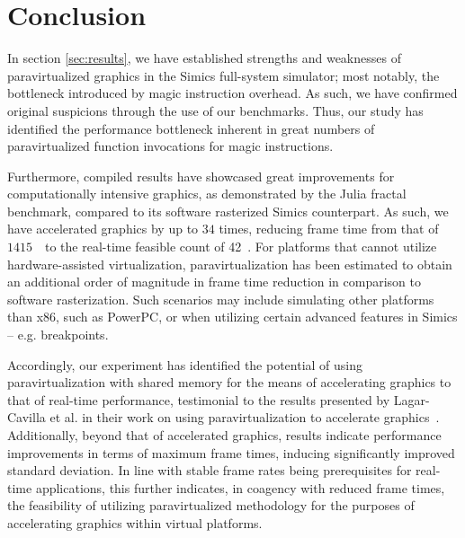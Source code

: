 
\section{Conclusion}
\label{sec:conclusion}
In section \ref{sec:results}, we have established strengths and weaknesses of paravirtualized graphics in the Simics full-system simulator; most notably, the bottleneck introduced by magic instruction overhead.
As such, we have confirmed original suspicions through the use of our benchmarks.
Thus, our study has identified the performance bottleneck inherent in great numbers of paravirtualized function invocations for magic instructions.

Furthermore, compiled results have showcased great improvements for computationally intensive graphics, as demonstrated by the Julia fractal benchmark, compared to its software rasterized Simics counterpart.
As such, we have accelerated graphics by up to $34$ times, reducing frame time from that of $1415$~\milli\second\ to the real-time feasible count of 42~\milli\second .
For platforms that cannot utilize hardware-assisted virtualization, paravirtualization has been estimated to obtain an additional order of magnitude in frame time reduction in comparison to software rasterization.
Such scenarios may include simulating other platforms than x86, such as PowerPC, or when utilizing certain advanced features in Simics -- e.g. breakpoints.

Accordingly, our experiment has identified the potential of using paravirtualization with shared memory for the means of accelerating graphics to that of real-time performance, testimonial to the results presented by Lagar-Cavilla et al. in their work on using paravirtualization to accelerate graphics~.
Additionally, beyond that of accelerated graphics, results indicate performance improvements in terms of maximum frame times, inducing significantly improved standard deviation.
In line with stable frame rates being prerequisites for real-time applications, this further indicates, in coagency with reduced frame times, the feasibility of utilizing paravirtualized methodology for the purposes of accelerating graphics within virtual platforms.


